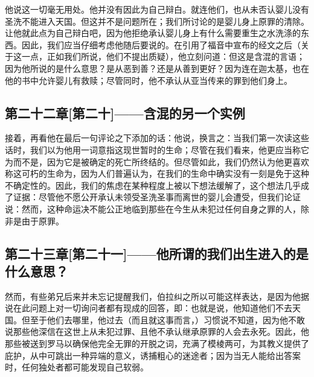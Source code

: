 他说这一切毫无用处。他并没有因此为自己辩白。就连他们，也从未否认婴儿没有圣洗不能进入天国。但这并不是问题所在；我们所讨论的是婴儿身上原罪的清除。让他就此点为自己辩白吧，因为他拒绝承认婴儿身上有什么需要重生之水洗涤的东西。因此，我们应当仔细考虑他随后要说的。在引用了福音中宣布的经文之后（关于这一点，正如我们所说，他们不提出质疑），他立刻问道：但这是含混的言语；因为他所说的是什么意思？是从恶到善？还是从善到更好？因为连在迦太基，也在他的书中允许婴儿有救赎；尽管同时，他不承认从亚当传来的罪到他们身上。\par


\subsection{第二十二章[第二十]——含混的另一个实例}

接着，再看他在最后一句评论之下添加的话：他说，换言之：当我们第一次读这些话时，我们以为他用一词意指这现世暂时的生命；尽管在我们看来，他更应当称它为而不是，因为它是被确定的死亡所终结的。但尽管如此，我们仍然认为他更喜欢称这可朽的生命为，因为人们普遍认为，在我们的生命中确实没有一刻是免于这种不确定性的。因此，我们的焦虑在某种程度上被以下想法缓解了，这个想法几乎成了证据：尽管他不愿公开承认未领受圣洗圣事而离世的婴儿会遭受，但我们论证说：然而，这种命运决不能公正地临到那些在今生从未犯过任何自身之罪的人，除非是由于原罪。\par


\subsection{第二十三章[第二十一]——他所谓的我们出生进入的是什么意思？}

然而，有些弟兄后来并未忘记提醒我们，伯拉纠之所以可能这样表达，是因为他据说在此问题上对一切询问者都有现成的回答，即：也就是说，他知道他们不去天国。但至于他们去哪里，他过去（而且就这事而言，）习惯说不知道，因为他不敢说那些他深信在这世上从未犯过罪、且他不承认继承原罪的人会去永死。因此，他那些被送到罗马以确保他完全无罪的开脱之词，充满了模棱两可，为其教义提供了庇护，从中可跳出一种异端的意义，诱捕粗心的迷途者；因为当无人能给出答案时，任何独处者都可能发现自己软弱。\par

